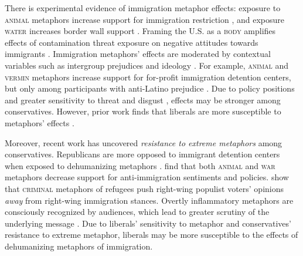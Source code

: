 There is experimental evidence of 
immigration metaphor effects: exposure to \textsc{animal} metaphors increase support for immigration restriction %
\citep{utych_how_2018}, and exposure \textsc{water} increases border wall support \citep{jimenez2021walls}. Framing the U.S. as a \textsc{body} amplifies effects of contamination threat exposure on negative attitudes towards immigrants \citep{landau_dirt_2014}. %
Immigration metaphors' effects are moderated by contextual variables such as intergroup prejudices and ideology \citep{marshall2018scurry,mccubbins_effects_2023}. For example, \textsc{animal} and \textsc{vermin} metaphors increase support for for-profit immigration detention centers, but only among participants with anti-Latino prejudice \citep{mccubbins_effects_2023}. %
Due to policy positions and greater sensitivity to threat and disgust \citep{jost2003political,inbar2009conservatives}, effects may be stronger among conservatives. However, prior work finds that liberals are more susceptible to metaphors' effects \citep{thibodeau_metaphors_2011,hart_riots_2018}. %

Moreover, recent work has uncovered \textit{resistance to extreme metaphors} among conservatives. Republicans are more opposed to immigrant detention centers when exposed to dehumanizing metaphors \citep{mccubbins_effects_2023}. \citet{hart_animals_2021} find that both \textsc{animal} and \textsc{war} metaphors decrease support for anti-immigration sentiments and policies. \citet{boeynaems_attractive_2023} show that \textsc{criminal} metaphors of refugees push right-wing populist voters' opinions \textit{away} from right-wing immigration stances. Overtly inflammatory metaphors are consciously recognized by audiences, which lead to greater scrutiny of the underlying message
\citep{hart_animals_2021}. Due to liberals' sensitivity to metaphor and conservatives' resistance to extreme metaphor, liberals may be more susceptible to the effects of dehumanizing metaphors of immigration.




